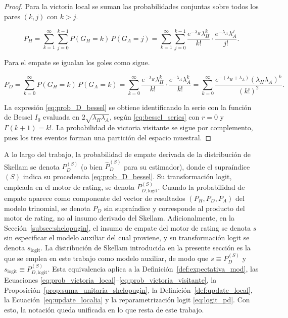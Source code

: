 \begin{proof}
	Para la victoria local se suman las probabilidades conjuntas sobre todos los pares $(k,j)$ con $k > j$.
	
	\[
	P_H = \sum_{k=1}^{\infty} \sum_{j=0}^{k-1} P(G_H = k)\,P(G_A = j)
	= \sum_{k=1}^{\infty} \sum_{j=0}^{k-1} \frac{e^{-\lambda_H} \lambda_H^{k}}{k!} \cdot \frac{e^{-\lambda_A} \lambda_A^{j}}{j!}.
	\]
		
	Para el empate se igualan los goles como sigue. 
	
	\[
	P_D = \sum_{k=0}^{\infty} P(G_H = k)\,P(G_A = k)
	= \sum_{k=0}^{\infty} \frac{e^{-\lambda_H}\lambda_H^k}{k!}\cdot\frac{e^{-\lambda_A}\lambda_A^k}{k!}
	= \sum_{k=0}^{\infty} \frac{e^{-(\lambda_H + \lambda_A)} (\lambda_H \lambda_A)^{k}}{(k!)^{2}}.
	\]
	
	La expresi\'on \eqref{eq:prob_D_bessel} se obtiene identificando la serie con la funci\'on de Bessel $I_0$ evaluada en $2\sqrt{\lambda_H\lambda_A}$, seg\'un \eqref{eq:bessel_series} con $r=0$ y $\Gamma(k+1)=k!$. La probabilidad de victoria visitante se sigue por complemento, pues los tres eventos forman una partici\'on del espacio muestral.
\end{proof}

\begin{obs}
	\label{obs:convencion_pd}
	A lo largo del trabajo, la probabilidad de empate derivada de la distribuci\'on de Skellam se denota $P_D^{(S)}$ (o bien $\hat{P}_D^{(S)}$ para su estimador), donde el supra\'indice $(S)$ indica su procedencia \eqref{eq:prob_D_bessel}. Su transformaci\'on logit, empleada en el motor de rating, se denota $P_{D,\text{logit}}^{(S)}$. Cuando la probabilidad de empate aparece como componente del vector de resultados $(P_H, P_D, P_A)$ del modelo trinomial, se denota $P_D$ sin supra\'indice y corresponde al producto del motor de rating, no al insumo derivado del Skellam. Adicionalmente, en la Secci\'on~\ref{subsec:shelopugin}, el insumo de empate del motor de rating se denota $s$ sin especificar el modelo auxiliar del cual proviene, y su transformaci\'on logit se denota $s_{\text{logit}}$. La distribuci\'on de Skellam introducida en la presente secci\'on es la que se emplea en este trabajo como modelo auxiliar, de modo que $s \equiv P_D^{(S)}$ y $s_{\text{logit}} \equiv P_{D,\text{logit}}^{(S)}$. Esta equivalencia aplica a la Definici\'on~\ref{def:expectativa_mod}, las Ecuaciones \eqref{eq:prob_victoria_local}--\eqref{eq:prob_victoria_visitante}, la Proposici\'on~\ref{prop:suma_unitaria_shelopugin}, la Definici\'on~\ref{def:update_local}, la Ecuaci\'on~\eqref{eq:update_localia} y la reparametrizaci\'on logit \eqref{eq:logit_pd}.
	Con esto, la notaci\'on queda unificada en lo que resta de este trabajo.
\end{obs}

